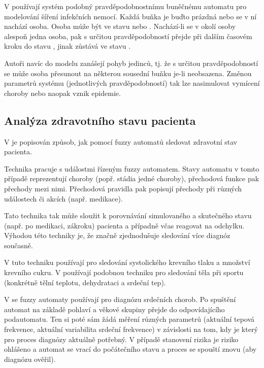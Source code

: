 V \cite{BocChe-CriBePrAuNetModSprInfDis+} používají systém podobný pravděpodobnostnímu buněčnému automatu pro modelování šíření infekčních nemocí. Každá buňka je buďto prázdná nebo se v ní nachází osoba. Osoba může být ve stavu  nebo . Nachází-li se v okolí  osoby alespoň jedna  osoba, pak s určitou pravděpodobností přejde při dalším časovém kroku do stavu , jinak zůstává ve stavu . 

Autoři navíc do modelu zanášejí pohyb jedinců, tj. že s určitou pravděpodobností se může osoba přesunout na některou sousední buňku je-li neobsazena. Změnou parametrů systému (jednotlivých pravděpodobností) tak lze nasimulovat vymícení choroby nebo naopak vznik epidemie.

\subsection{Analýza zdravotního stavu pacienta}
V \cite{Jia+-ExHeaSimMetBasIntHumTheMod, GupRah-CliMonUsFuzSys, CamMerNun-UsFuzAutDiagPrHeaPro, SteAdl-CliMonFuzAut} je popisován způsob, jak pomocí fuzzy automatů sledovat zdravotní stav pacienta. 

Technika pracuje s událostmi řízeným fuzzy automatem. Stavy automatu v tomto případě reprezentují choroby (popř. stádia jedné choroby), přechodová funkce pak přechody mezi nimi. Přechodová pravidla pak popisují přechody při různých událostech či akcích (např. medikace). 

Tato technika tak může sloužit k porovnávání simulovaného a skutečného stavu (např. po medikaci, zákroku) pacienta a případně včas reagovat na odchylku. Výhodou této techniky je, že značně zjednodušuje sledování více diagnóz současně.

V \cite{GupRah-CliMonUsFuzSys} tuto techniku používají pro sledování systolického krevního tlaku a množství krevního cukru. V \cite{Jia+-ExHeaSimMetBasIntHumTheMod} používají podobnou techniku pro sledování těla při sportu (konkrétně tělní teplotu, dehydrataci a srdeční tep).

V \cite{CamMerNun-UsFuzAutDiagPrHeaPro} se fuzzy automaty používají pro diagnózu srdečních chorob. Po spuštění automat na základě pohlaví a věkové skupiny přejde do odpovídajícího podautomatu. Ten si poté sám žádá měření různých parametrů (aktuální tepová frekvence, aktuální variabilita srdeční frekvence) v závislosti na tom, kdy je který pro proces diagnózy aktuálně potřebný. V případě stanovení rizika je riziko ohlášeno a automat se vrací do počátečního stavu a proces se spouští znovu (aby diagnózu ověřil). 


